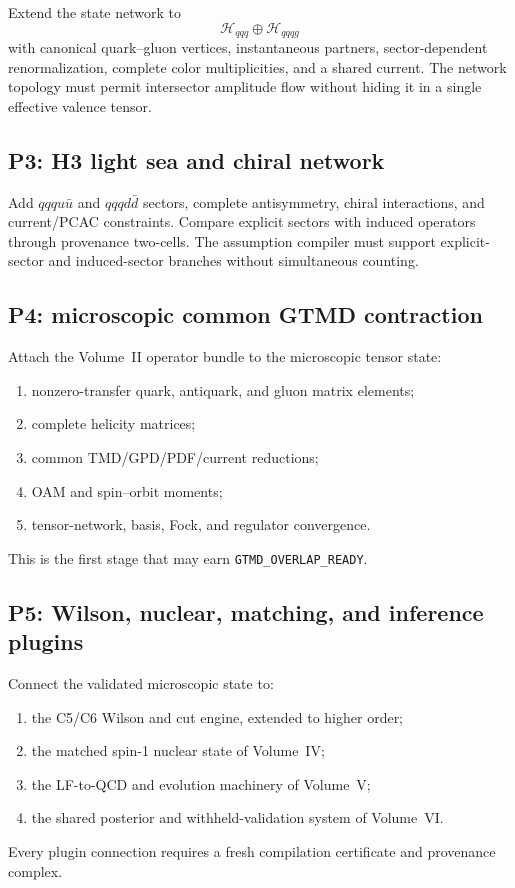 \documentclass[11pt]{article}
\newcommand{\Hil}{\mathcal H}
\begin{document}
Extend the state network to
\begin{equation}
 \Hil_{qqq}\oplus\Hil_{qqqg}
\label{eq:p2-fock-space}
\end{equation}
with canonical quark--gluon vertices, instantaneous partners, sector-dependent
renormalization, complete color multiplicities, and a shared current.  The
network topology must permit intersector amplitude flow without hiding it in a
single effective valence tensor.

\subsection{P3: H3 light sea and chiral network}

Add \(qqqu\bar u\) and \(qqqd\bar d\) sectors, complete antisymmetry, chiral
interactions, and current/PCAC constraints.  Compare explicit sectors with
induced operators through provenance two-cells.  The assumption compiler must
support explicit-sector and induced-sector branches without simultaneous
counting.

\subsection{P4: microscopic common GTMD contraction}

Attach the Volume~II operator bundle to the microscopic tensor state:
\begin{enumerate}
 \item nonzero-transfer quark, antiquark, and gluon matrix elements;
 \item complete helicity matrices;
 \item common TMD/GPD/PDF/current reductions;
 \item OAM and spin--orbit moments;
 \item tensor-network, basis, Fock, and regulator convergence.
\end{enumerate}
This is the first stage that may earn \texttt{GTMD\_OVERLAP\_READY}.

\subsection{P5: Wilson, nuclear, matching, and inference plugins}

Connect the validated microscopic state to:
\begin{enumerate}
 \item the C5/C6 Wilson and cut engine, extended to higher order;
 \item the matched spin-1 nuclear state of Volume~IV;
 \item the LF-to-QCD and evolution machinery of Volume~V;
 \item the shared posterior and withheld-validation system of Volume~VI.
\end{enumerate}
Every plugin connection requires a fresh compilation certificate and
provenance complex.
\end{document}
